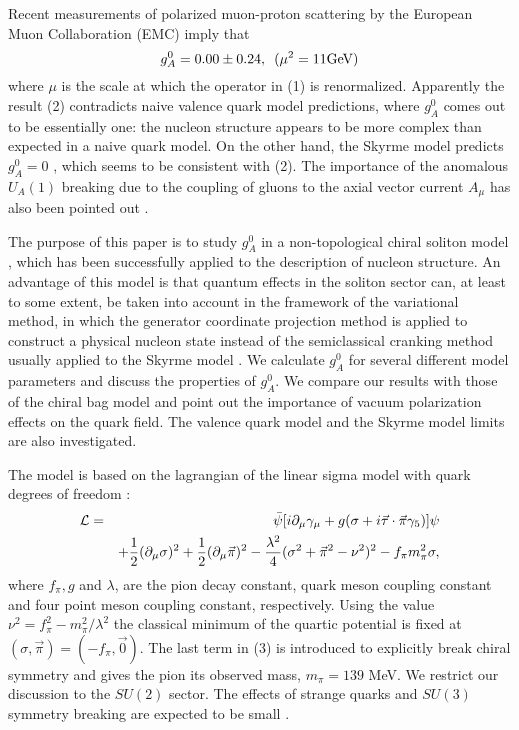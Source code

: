 Recent measurements of polarized muon-proton scattering by the European
Muon Collaboration (EMC) imply that \cite{EMC}
\begin{equation}
g_A^0 = 0.00 \pm 0.24, \, \, \, (\mu ^2 = 11 \hbox{GeV})
\end{equation}
where $\mu$ is the scale at which the operator in (1) is renormalized.
Apparently
the result (2) contradicts naive valence quark model predictions,
where $g_A^0$ comes out to be essentially one:  the nucleon structure appears
to be more complex than expected in a naive quark model.
On the other hand, the Skyrme model predicts $g_A^0=0$ 
\cite{BEK},  which
seems   to be consistent with (2).  The importance of the anomalous
$U_A(1)$ breaking due to the coupling of gluons to the
axial vector current $A_\mu$ has also been pointed out \cite{AR}. 


The purpose of this paper is to study $g_A^0$ in a non-topological
chiral soliton model \cite{BB}, which has been successfully
applied to the description of nucleon structure.
An advantage
of this model is that quantum effects  in the soliton  sector can,
at least to some extent, be taken into account in the framework of the
variational  method,  in which the generator  coordinate  projection
method \cite{BG,PY}  is applied to construct  a physical  nucleon
state  instead  of  the  semiclassical  cranking  method  usually
applied to the Skyrme model \cite{ANW}.  We calculate $g_A^0$ for
several different model parameters and discuss the properties  of
$g_A^0$.   We compare  our results  with those of the chiral  bag
model  \cite{PH}  and  point  out  the  importance  of vacuum
polarization effects on the quark field.  The valence
quark model and the Skyrme model limits are also investigated.

The model is based  on the lagrangian  of the linear  sigma model
with quark degrees of freedom :
\begin{eqnarray}  {\cal L} & = & \bar  \psi [i
\partial  _\mu \gamma _\mu + g ( \sigma  + i \vec \tau \cdot \vec
\pi \gamma  _5 ) ] \psi \nonumber  \\
 & & + {1 \over 2} (\partial
_\mu  \sigma)^2  + {1 \over  2} (\partial  _\mu  \vec  \pi )^2  -
{\lambda^2  \over  4} 
 ( \sigma  ^2 + \vec  \pi  ^2  - \nu  ^2 )^2
-f_\pi m_\pi^2\sigma,
\end{eqnarray}
where  $f_\pi  , g$ and $\lambda$,  are  the pion
decay  constant,  quark  meson coupling  constant  and four point
meson coupling constant, respectively. Using the value 
$ \nu^2 = f_\pi^2 -m_\pi^2 / \lambda^2$ 
the classical minimum of the quartic
potential is fixed at $(\sigma,\vec{\pi})=(-f_\pi,\vec{0})$. The
last  term in (3) is introduced to explicitly break chiral
symmetry and gives the pion its observed mass, $m_\pi=139$ MeV.
We restrict our discussion to the $SU(2)$ sector. The effects
of strange quarks and $SU(3)$ symmetry breaking  are expected  to
be small \cite{SC}. 

